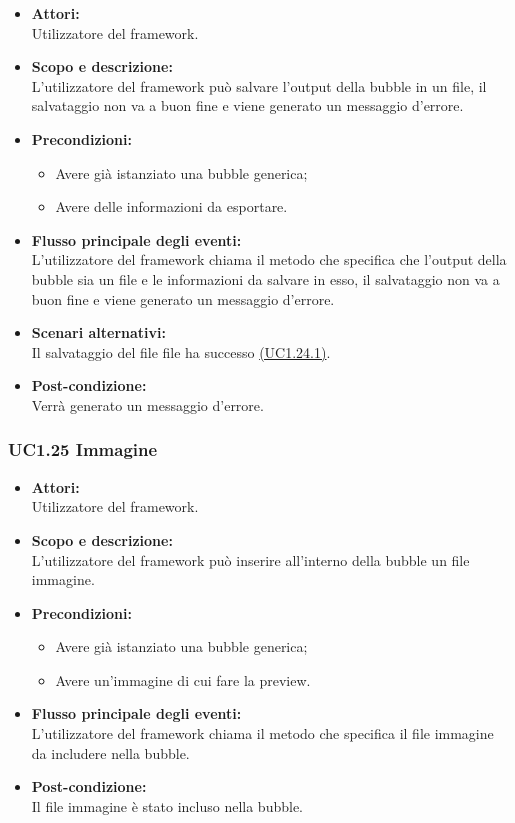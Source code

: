\begin{itemize}
	\item \textbf{Attori:}
	\\Utilizzatore del framework.
	\item \textbf{Scopo e descrizione:} 
	\\L’utilizzatore del framework può salvare l’output della bubble in un file, il salvataggio non va a buon fine e viene generato un messaggio d’errore.
	\item \textbf{Precondizioni:}
	\begin{itemize}
		\item Avere già istanziato una bubble generica;
		\item Avere delle informazioni da esportare.
	\end{itemize}
	\item \textbf{Flusso principale degli eventi:}
	\\L’utilizzatore del framework chiama il metodo che specifica che l’output della bubble sia un file e le informazioni da salvare in esso,  il salvataggio non va a buon fine e viene generato un messaggio d’errore.
	\item \textbf{Scenari alternativi:}
	\\Il salvataggio del file file ha successo \hyperref[UC1.24.1]{(UC1.24.1)}.
	\item \textbf{Post-condizione:}
	\\Verrà generato un messaggio d’errore.
\end{itemize}

\subsubsection{UC1.25 Immagine} \label{UC1.25}

\begin{itemize}
	\item \textbf{Attori:}
	\\Utilizzatore del framework.
	\item \textbf{Scopo e descrizione:} 
	\\L’utilizzatore del framework può inserire all'interno della bubble un file immagine.
	\item \textbf{Precondizioni:}
	\begin{itemize}
		\item Avere già istanziato una bubble generica;
		\item Avere un'immagine di cui fare la preview.
	\end{itemize}
	\item \textbf{Flusso principale degli eventi:}
	\\L’utilizzatore del framework chiama il metodo che specifica il file immagine da includere nella bubble.
	\item \textbf{Post-condizione:}
	\\Il file immagine è stato incluso nella bubble.
\end{itemize}

